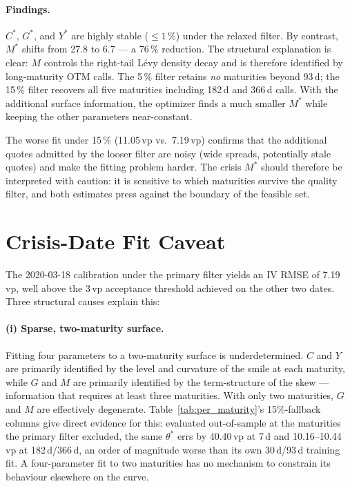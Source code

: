 \documentclass[11pt,a4paper]{article}
\begin{document}
\paragraph{Findings.}
$C^*$, $G^*$, and $Y^*$ are highly stable ($\le 1\,\%$) under the relaxed
filter.  By contrast, $M^*$ shifts from 27.8 to 6.7 — a 76\,\% reduction.
The structural explanation is clear: $M$ controls the right-tail Lévy
density decay and is therefore identified by long-maturity OTM calls.
The 5\,\% filter retains \emph{no} maturities beyond 93\,d; the 15\,\%
filter recovers all five maturities including 182\,d and 366\,d calls.
With the additional surface information, the optimizer finds a much smaller
$M^*$ while keeping the other parameters near-constant.

The worse fit under 15\,\% (11.05\,vp vs.\ 7.19\,vp) confirms that the
additional quotes admitted by the looser filter are noisy (wide spreads,
potentially stale quotes) and make the fitting problem harder.
The crisis $M^*$ should therefore be interpreted with caution:
it is sensitive to which maturities survive the quality filter, and both
estimates press against the boundary of the feasible set.

\section{Crisis-Date Fit Caveat}
\label{sec:crisis_caveat}

The 2020-03-18 calibration under the primary filter yields an IV RMSE of
7.19\,vp, well above the 3\,vp acceptance threshold achieved on the other
two dates.
Three structural causes explain this:

\paragraph{(i) Sparse, two-maturity surface.}
Fitting four parameters to a two-maturity surface is underdetermined.
$C$ and $Y$ are primarily identified by the level and curvature of the smile
at each maturity, while $G$ and $M$ are primarily identified by the
term-structure of the skew — information that requires at least three
maturities.  With only two maturities, $G$ and $M$ are effectively
degenerate.
Table~\ref{tab:per_maturity}'s 15\%-fallback columns give direct evidence
for this: evaluated out-of-sample at the maturities the primary filter
excluded, the same $\theta^*$ errs by 40.40\,vp at 7\,d and
10.16--10.44\,vp at 182\,d/366\,d, an order of magnitude worse than its
own 30\,d/93\,d training fit. A four-parameter fit to two maturities has
no mechanism to constrain its behaviour elsewhere on the curve.
\end{document}
